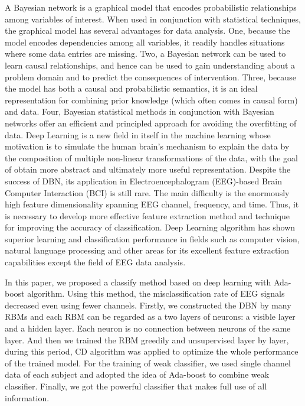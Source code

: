 \documentclass{llncs}
\begin{document}
A Bayesian network is a graphical model that encodes probabilistic relationships among variables of interest. When used in conjunction with statistical techniques, the graphical model has several advantages for data analysis. One, because the model encodes
dependencies among all variables, it readily handles situations where some data entries are missing. Two, a Bayesian network can be used to learn causal relationships, and hence can be used to gain understanding about a problem domain and to predict the
consequences of intervention. Three, because the model has both a causal and probabilistic semantics, it is an ideal representation for combining prior knowledge (which often comes in causal form) and data. Four, Bayesian statistical methods in conjunction with Bayesian networks offer an efficient and principled approach for avoiding the
overfitting of data. 
Deep Learning is a new field in itself in the machine learning whose motivation is to simulate the human brain’s mechanism to explain the data by the composition of multiple non-linear transformations of the data, with the goal of obtain more abstract and ultimately more useful representation\cite{3}\cite{5}. Despite the success of DBN, its application in Electroencephalogram (EEG)-based Brain Computer Interaction (BCI) is still rare. The main difficulty is the enormously high feature dimensionality spanning EEG channel, frequency, and time\cite{10}. Thus, it is necessary to develop more effective feature extraction method and technique for improving the accuracy of classification. Deep Learning algorithm has shown superior learning and classification performance in fields such as computer vision, natural language processing and other areas for its excellent feature extraction capabilities except the field of EEG data analysis\cite{15}. 

In this paper, we proposed a classify method based on deep learning with Ada-boost algorithm. Using this method, the misclassification rate of EEG signals decreased even using fewer channels. Firstly, we constructed the DBN by many RBMs and each RBM can be regarded as a two layers of neurons: a visible layer and a hidden layer. Each neuron is no connection between neurons of the same layer. And then we trained the RBM greedily and unsupervised layer by layer, during this period, CD algorithm was applied to optimize the whole performance of the trained model. For the training of weak classifier, we used single channel data of each subject and adopted the idea of Ada-boost to combine weak classifier. Finally, we got the powerful classifier that makes full use of all information. 
\end{document}
